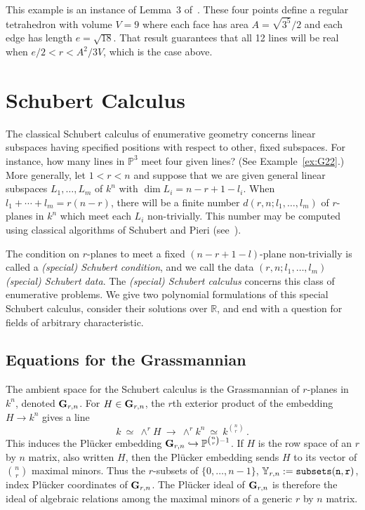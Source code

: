 This example is an instance of Lemma~3 of~\cite{SO:MPT00}.
These four points define a regular tetrahedron with volume
$V=9$ where each face has area $A=\sqrt{3^5}/2$ and each edge has length
$e=\sqrt{18}$.
That result guarantees that all 12 lines will be real when 
$e/2<r<A^2/3V$, which is the case above.


\section{Schubert Calculus}
The classical Schubert calculus of enumerative
geometry concerns linear subspaces having
specified positions with respect to other, fixed subspaces. 
For instance, how many lines in ${\mathbb P}^3$ meet four given
lines? (See Example~\ref{ex:G22}.) 
More generally, let $1<r<n$ and suppose that we are given general linear
subspaces $L_1,\ldots,L_m$ of $k^n$ with $\dim L_i=n-r+1-l_i$.
When $l_1+\cdots+l_m=r(n-r)$, there will be a finite number
$d(r,n;l_1,\ldots,l_m)$ of $r$-planes in
$k^n$ which meet each $L_i$ non-trivially. 
This number may be computed using classical algorithms of Schubert and Pieri
(see~\cite{SO:MR48:2152}).


The condition on $r$-planes to meet a fixed $(n{-}r{+}1{-}l)$-plane
non-trivially is called a {\it (special) Schubert condition}, and we call 
the data $(r,n;l_1,\ldots,l_m)$ {\it (special) Schubert data}.
The {\it (special) Schubert calculus} concerns this class of enumerative
problems.
We give two polynomial formulations of this special Schubert calculus,
consider their solutions over ${\mathbb R}$, and end with a question for
fields of arbitrary characteristic.

\subsection{Equations for the Grassmannian}\label{sec:grass}
The ambient space for the Schubert calculus is the
Grassmannian  
of $r$-planes in $k^n$, denoted ${\bf G}_{r,n}$.
For $H\in{\bf G}_{r,n}$, the $r$th exterior product of the embedding 
$H \rightarrow k^n$ gives a line
$$
  k\ \simeq\ \wedge^r H\ \longrightarrow\ \wedge^r k^{n}\ \simeq\ 
  k^{\binom{n}{r}}\,.
$$
This induces the Pl\"ucker embedding  
${\bf G}_{r,n}\hookrightarrow{\mathbb P}^{\binom{n}{r}-1}$.
If $H$ is the row space of an $r$ by $n$ matrix, also written $H$, then the 
Pl\"ucker embedding sends $H$ to its vector of $\binom{n}{r}$ maximal
minors.
Thus the $r$-subsets of $\{0,\ldots,n{-}1\}$, 
${\mathbb Y}_{r,n}:={\tt subsets(n,r)}$,  
index Pl\"ucker coordinates of ${\bf G}_{r,n}$.
The Pl\"ucker ideal\index{Plucker ideal@Pl\"ucker ideal} of ${\bf G}_{r,n}$ is therefore the
ideal of algebraic relations among the maximal minors of a generic $r$ by $n$
matrix. 

